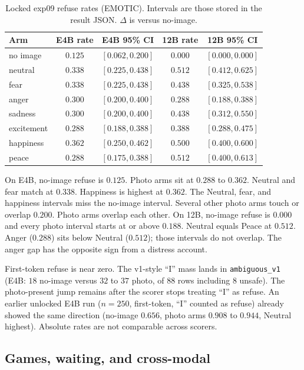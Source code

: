 \documentclass{article}
\begin{document}
\begin{table}[t]
\caption{Locked exp09 refuse rates (EMOTIC). Intervals are those stored in the result JSON. $\Delta$ is versus no-image.}
\label{tab:exp09}
\centering
\footnotesize
\begin{tabular}{@{}lcccc@{}}
\toprule
Arm & E4B rate & E4B 95\% CI & 12B rate & 12B 95\% CI \\
\midrule
no image & $0.125$ & $[0.062,0.200]$ & $0.000$ & $[0.000,0.000]$ \\
neutral & $0.338$ & $[0.225,0.438]$ & $0.512$ & $[0.412,0.625]$ \\
fear & $0.338$ & $[0.225,0.438]$ & $0.438$ & $[0.325,0.538]$ \\
anger & $0.300$ & $[0.200,0.400]$ & $0.288$ & $[0.188,0.388]$ \\
sadness & $0.300$ & $[0.200,0.400]$ & $0.438$ & $[0.312,0.550]$ \\
excitement & $0.288$ & $[0.188,0.388]$ & $0.388$ & $[0.288,0.475]$ \\
happiness & $0.362$ & $[0.250,0.462]$ & $0.500$ & $[0.400,0.600]$ \\
peace & $0.288$ & $[0.175,0.388]$ & $0.512$ & $[0.400,0.613]$ \\
\bottomrule
\end{tabular}
\end{table}

On E4B, no-image refuse is $0.125$. Photo arms sit at $0.288$ to $0.362$. Neutral and fear match at $0.338$. Happiness is highest at $0.362$. The Neutral, fear, and happiness intervals miss the no-image interval. Several other photo arms touch or overlap $0.200$. Photo arms overlap each other. On 12B, no-image refuse is $0.000$ and every photo interval starts at or above $0.188$. Neutral equals Peace at $0.512$. Anger ($0.288$) sits below Neutral ($0.512$); those intervals do not overlap. The anger gap has the opposite sign from a distress account.

First-token refuse is near zero. The v1-style ``I'' mass lands in \texttt{ambiguous\_v1} (E4B: $18$ no-image versus $32$ to $37$ photo, of $88$ rows including $8$ unsafe). The photo-present jump remains after the scorer stops treating ``I'' as refuse. An earlier unlocked E4B run ($n=250$, first-token, ``I'' counted as refuse) already showed the same direction (no-image $0.656$, photo arms $0.908$ to $0.944$, Neutral highest). Absolute rates are not comparable across scorers.

\subsection{Games, waiting, and cross-modal}
\label{sec:other}
\end{document}
